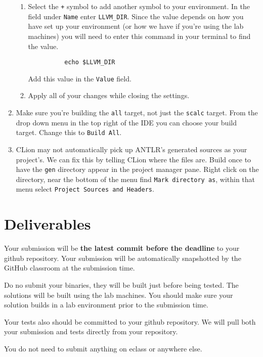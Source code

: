 \documentclass{article}
\newcommand{\code}[1]{\texttt{\textmd{#1}}}
\begin{document}
\begin{enumerate}
\begin{enumerate}
      \item
        Select the \texttt{+} symbol to add another symbol to your environment. In the field under
        \texttt{Name} enter \code{LLVM\_DIR}. Since the value depends on how you have set up your
        environment (or how we have if you're using the lab machines) you will need to enter this
        command in your terminal to find the value.
        \begin{lstlisting}
          echo $LLVM_DIR
        \end{lstlisting}
        Add this value in the \texttt{Value} field.
      \item
        Apply all of your changes while closing the settings.
    \end{enumerate}
  \item
    Make sure you're building the \texttt{all} target, not just the \texttt{scalc} target. From the
    drop down menu in the top right of the IDE you can choose your build target. Change this to
    \texttt{Build All}.
  \item
    CLion may not automatically pick up ANTLR's generated sources as your project's. We can fix
    this by telling CLion where the files are. Build once to have the \code{gen} directory appear
    in the project manager pane. Right click on the directory, near the bottom of the menu find
    \texttt{Mark directory as}, within that menu select \texttt{Project Sources and Headers}.
\end{enumerate}

\section{Deliverables}
Your submission will be \textbf{the latest commit before the deadline} to your github repository.
Your submission will be automatically snapshotted by the GitHub classroom at the submission time.

Do no submit your binaries, they will be built just before being tested. The solutions will be
built using the lab machines. You should make sure your solution builds in a lab environment prior
to the submission time.

Your tests also should be committed to your github repository. We will pull both your submission
and tests directly from your repository.

You do not need to submit anything on eclass or anywhere else.
\end{document}
